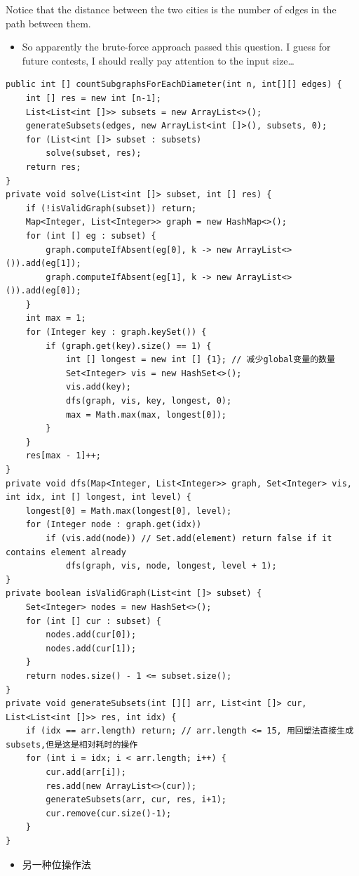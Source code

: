 \documentclass[9pt, b5paaper]{book}
\begin{document}
Notice that the distance between the two cities is the number of edges in the path between them.
\begin{itemize}
\item So apparently the brute-force approach passed this question. I guess for future contests, I should really pay attention to the input size\ldots{}
\end{itemize}
\begin{verbatim}
public int [] countSubgraphsForEachDiameter(int n, int[][] edges) {
    int [] res = new int [n-1];
    List<List<int []>> subsets = new ArrayList<>();
    generateSubsets(edges, new ArrayList<int []>(), subsets, 0);
    for (List<int []> subset : subsets) 
        solve(subset, res);
    return res;
}
private void solve(List<int []> subset, int [] res) {
    if (!isValidGraph(subset)) return;
    Map<Integer, List<Integer>> graph = new HashMap<>();
    for (int [] eg : subset) {
        graph.computeIfAbsent(eg[0], k -> new ArrayList<>()).add(eg[1]);
        graph.computeIfAbsent(eg[1], k -> new ArrayList<>()).add(eg[0]);
    }
    int max = 1;
    for (Integer key : graph.keySet()) {
        if (graph.get(key).size() == 1) {
            int [] longest = new int [] {1}; // 减少global变量的数量
            Set<Integer> vis = new HashSet<>();
            vis.add(key);
            dfs(graph, vis, key, longest, 0);
            max = Math.max(max, longest[0]);
        }
    }
    res[max - 1]++;
}
private void dfs(Map<Integer, List<Integer>> graph, Set<Integer> vis, int idx, int [] longest, int level) {
    longest[0] = Math.max(longest[0], level);
    for (Integer node : graph.get(idx)) 
        if (vis.add(node)) // Set.add(element) return false if it contains element already
            dfs(graph, vis, node, longest, level + 1);
}
private boolean isValidGraph(List<int []> subset) {
    Set<Integer> nodes = new HashSet<>();
    for (int [] cur : subset) {
        nodes.add(cur[0]);
        nodes.add(cur[1]);
    }
    return nodes.size() - 1 <= subset.size();
}
private void generateSubsets(int [][] arr, List<int []> cur, List<List<int []>> res, int idx) {
    if (idx == arr.length) return; // arr.length <= 15, 用回塑法直接生成subsets,但是这是相对耗时的操作
    for (int i = idx; i < arr.length; i++) {
        cur.add(arr[i]);
        res.add(new ArrayList<>(cur));
        generateSubsets(arr, cur, res, i+1);
        cur.remove(cur.size()-1);
    }
}
\end{verbatim}
\begin{itemize}
\item 另一种位操作法
\end{itemize}
\end{document}
